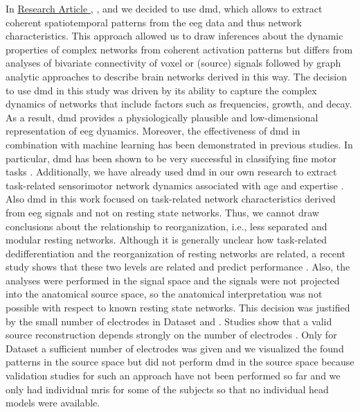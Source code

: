 In \hyperref[results:paperI]{Research Article }, \hyperref[results:paperIII]{}, and \hyperref[results:paperIV]{} we decided to use \gls{dmd}, which allows to extract coherent spatiotemporal patterns from the \gls{eeg} data and thus network characteristics. This approach allowed us to draw inferences about the dynamic properties of complex networks from coherent activation patterns \cite{Brunton2016} but differs from analyses of bivariate connectivity of voxel or (source) signals followed by graph analytic approaches to describe brain networks derived in this way. The decision to use \gls{dmd} in this study was driven by its ability to capture the complex dynamics of networks that include factors such as frequencies, growth, and decay. As a result, \gls{dmd} provides a physiologically plausible and low-dimensional representation of \gls{eeg} dynamics. Moreover, the effectiveness of \gls{dmd} in combination with machine learning has been demonstrated in previous studies. In particular, \gls{dmd} has been shown to be very successful in classifying fine motor tasks \cite{Shiraishi2020}. Additionally, we have already used \gls{dmd} in our own research to extract task-related sensorimotor network dynamics associated with age and expertise \cite{Vieluf2018,Goelz2018}. Also \gls{dmd} in this work focused on task-related network characteristics derived from \gls{eeg} signals and not on resting state networks. Thus, we cannot draw conclusions about the relationship to reorganization, i.e., less separated and modular resting networks. Although it is generally unclear how task-related dedifferentiation and the reorganization of resting networks are related, a recent study shows that these two levels are related and predict performance \cite{Cassedy2020netw_distinct}. Also, the analyses were performed in the signal space and the signals were not projected into the anatomical source space, so the anatomical interpretation was not possible with respect to known resting state networks. This decision was justified by the small number of electrodes in Dataset  and . Studies show that a valid source reconstruction depends strongly on the number of electrodes \cite{Song2015,Lantz2003}. Only for Dataset  a sufficient number of electrodes was given and we visualized the found patterns in the source space but did not perform \gls{dmd} in the source space because validation studies for such an approach have not been performed so far and we only had individual \glspl{mri} for some of the subjects so that no individual head models were available.\\
